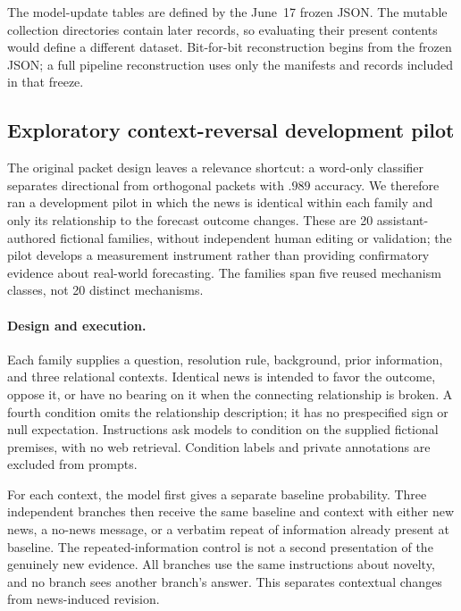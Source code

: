 The model-update tables are defined by the June~17 frozen JSON. The mutable collection
directories contain later records, so evaluating their present contents would
define a different dataset. Bit-for-bit reconstruction begins from the frozen
JSON; a full pipeline reconstruction uses only the manifests and records included
in that freeze.
\subsection{Exploratory context-reversal development pilot}
\label{app:exp1-context-reversal}

The original packet design leaves a relevance shortcut: a word-only classifier
separates directional from orthogonal packets with $.989$ accuracy. We therefore
ran a development pilot in which the news is identical within each family and
only its relationship to the forecast outcome changes. These are 20
assistant-authored fictional families, without independent human editing or
validation; the pilot develops a measurement instrument rather than providing
confirmatory evidence about real-world forecasting. The families span five reused
mechanism classes, not 20 distinct mechanisms.

\paragraph{Design and execution.}
Each family supplies a question, resolution rule, background, prior information,
and three relational contexts. Identical news is intended to favor the outcome,
oppose it, or have no bearing on it when the connecting relationship is broken.
A fourth condition omits the relationship description; it has no prespecified
sign or null expectation. Instructions ask models to condition on the supplied
fictional premises, with no web retrieval. Condition labels and private
annotations are excluded from prompts.

For each context, the model first gives a separate baseline probability. Three
independent branches then receive the same baseline and context with either
new news, a no-news message, or a verbatim repeat of information already present
at baseline. The repeated-information control is not a second presentation of
the genuinely new evidence. All branches use the same instructions about novelty,
and no branch sees another branch's answer. This separates contextual changes
from news-induced revision.

